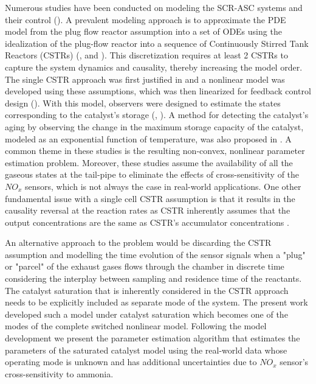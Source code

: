 Numerous studies have been conducted on modeling the SCR-ASC systems and their control (\cite{yuan2015diesel}). A
prevalent modeling approach is to approximate the PDE model from the plug flow reactor assumption into a set of ODEs
using the idealization of the plug-flow reactor into a sequence of Continuously Stirred Tank Reactors (CSTRs)
(\cite{hsieh2011development}, and \cite{nova2014urea}). This discretization requires at least 2 CSTRs to capture the
system dynamics and causality, thereby increasing the model order. The single CSTR approach was first justified in
\cite{devarakonda2008adequacy} and a nonlinear model was developed using these assumptions, which was then linearized
for feedback control design (\cite{devarakonda2009model}). With this model, observers were designed to estimate the
states corresponding to the catalyst's storage (\cite{ma2017observer}, \cite{jain2020term}). A method for detecting the
catalyst's aging by observing the change in the maximum storage capacity of the catalyst, modeled as an exponential
function of temperature, was also proposed in \cite{ma2017observer}. A common theme in these studies is the resulting
non-convex, nonlinear parameter estimation problem. Moreover, these studies assume the availability of all the gaseous
states at the tail-pipe to eliminate the effects of cross-sensitivity of the $NO_x$ sensors, which is not always the
case in real-world applications. One other fundamental issue with a single cell CSTR assumption is that it results in
the causality reversal at the reaction rates as CSTR inherently assumes that the output concentrations are the same as
CSTR's accumulator concentrations \cite{charla2024reduced}.

An alternative approach to the problem would be discarding the CSTR assumption and modelling the time evolution of the
sensor signals when a "plug" or "parcel" of the exhaust gases flows through the chamber in discrete time considering the
interplay between sampling and residence time of the reactants. The catalyst saturation that is inherently considered in
the CSTR approach needs to be explicitly included as separate mode of the system. The present work developed such a
model under catalyst saturation which becomes one of the modes of the complete switched nonlinear model. Following the
model development we present the parameter estimation algorithm that estimates the parameters of the saturated catalyst
model using the real-world data whose operating mode is unknown and has additional uncertainties due to $NO_x$ sensor's
cross-sensitivity to ammonia.
